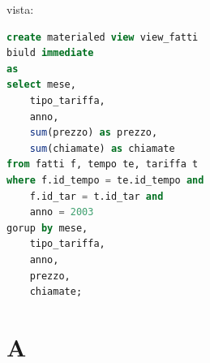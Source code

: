 \documentclass[12pt]{article}
\begin{document}
vista:
\begin{lstlisting}[language=sql]
create materialed view view_fatti
biuld immediate
as
select mese,
    tipo_tariffa,
    anno,
    sum(prezzo) as prezzo,
    sum(chiamate) as chiamate
from fatti f, tempo te, tariffa t
where f.id_tempo = te.id_tempo and
    f.id_tar = t.id_tar and
    anno = 2003
gorup by mese,
    tipo_tariffa,
    anno,
    prezzo,
    chiamate;
\end{lstlisting}



\newpage
\section{A}
\end{document}
